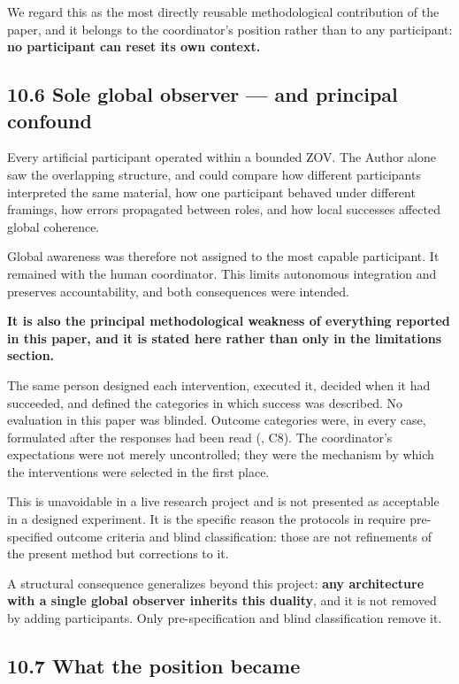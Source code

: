 We regard this as the most directly reusable methodological contribution of the paper, and it belongs to the coordinator's position rather than to any participant: \textbf{no participant can reset its own context.}


\subsection*{10.6 Sole global observer — and principal confound}
\label{sec:en:10.6}

Every artificial participant operated within a bounded ZOV. The Author alone saw the overlapping structure, and could compare how different participants interpreted the same material, how one participant behaved under different framings, how errors propagated between roles, and how local successes affected global coherence.

Global awareness was therefore not assigned to the most capable participant. It remained with the human coordinator. This limits autonomous integration and preserves accountability, and both consequences were intended.

\textbf{It is also the principal methodological weakness of everything reported in this paper, and it is stated here rather than only in the limitations section.}

The same person designed each intervention, executed it, decided when it had succeeded, and defined the categories in which success was described. No evaluation in this paper was blinded. Outcome categories were, in every case, formulated after the responses had been read (, C8). The coordinator's expectations were not merely uncontrolled; they were the mechanism by which the interventions were selected in the first place.

This is unavoidable in a live research project and is not presented as acceptable in a designed experiment. It is the specific reason the protocols in  require pre-specified outcome criteria and blind classification: those are not refinements of the present method but corrections to it.

A structural consequence generalizes beyond this project: \textbf{any architecture with a single global observer inherits this duality}, and it is not removed by adding participants. Only pre-specification and blind classification remove it.


\subsection*{10.7 What the position became}
\label{sec:en:10.7}

